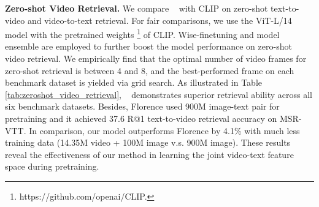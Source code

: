 \textbf{Zero-shot Video Retrieval.}
We compare \model~ with CLIP on zero-shot text-to-video and video-to-text retrieval. For fair comparisons, we use the ViT-L/14 model with the pretrained weights \footnote{https://github.com/openai/CLIP.} of CLIP. Wise-finetuning \cite{wortsman2022robust} and model ensemble are employed to further boost the model performance on zero-shot video retrieval. We empirically find that the optimal number of video frames for zero-shot retrieval is between 4 and 8, and the best-performed frame on each benchmark dataset is yielded via grid search. As illustrated in Table \ref{tab:zeroshot_video_retrieval}, \model~ demonstrates superior retrieval ability across all six benchmark datasets. Besides, Florence \cite{florence} used 900M image-text pair for pretraining and it achieved 37.6 R@1 text-to-video retrieval accuracy on MSR-VTT. In comparison, our model outperforms Florence by 4.1\% with much less training data (14.35M video + 100M image v.s. 900M image). These results reveal the effectiveness of our method in learning the joint video-text feature space during pretraining. 

